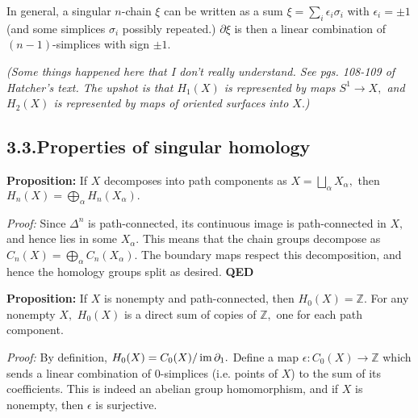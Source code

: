 \documentclass{article}
\begin{document}
\noindent{}In general, a singular $n$-chain $\xi$ can be written as a sum $\xi = \sum_i \epsilon_i \sigma_i$ with $\epsilon_i = \pm 1$ (and some simplices $\sigma_i$ possibly repeated.) $\partial\xi$ is then a linear combination of $(n-1)$-simplices with sign $\pm 1.$%

\emph{(Some things happened here that I don't really understand. See pgs. 108-109 of Hatcher's text. The upshot is that $H_1(X)$ is represented by maps $S^1 \to X,$ and $H_2(X)$ is represented by maps of oriented surfaces into $X.$)}%

\subsection{3.3.\hspace*{0.5em}Properties of singular homology}\label{sec-properties-of-singular-homology}%

\noindent{}\textbf{Proposition:} If $X$ decomposes into path components as $X = \bigsqcup_\alpha X_\alpha,$ then $H_n(X) = \bigoplus_\alpha H_n(X_\alpha).$%

\emph{Proof:} Since $\Delta^n$ is path-connected, its continuous image is path-connected in $X,$ and hence lies in some $X_\alpha.$ This means that the chain groups decompose as $C_n(X) = \bigoplus_\alpha C_n(X_\alpha).$ The boundary maps respect this decomposition, and hence the homology groups split as desired. \textbf{QED}%

\textbf{Proposition:} If $X$ is nonempty and path-connected, then $H_0(X) = \mathbb{Z}.$ For any nonempty $X,$ $H_0(X)$ is a direct sum of copies of $\mathbb{Z},$ one for each path component.%

\emph{Proof:} By definition, $H_0(X) = C_0(X) / \operatorname{im} \partial_1.$ Define a map $\epsilon: C_0(X) \to \mathbb{Z}$ which sends a linear combination of $0$-simplices (i.e. points of $X$) to the sum of its coefficients. This is indeed an abelian group homomorphism, and if $X$ is nonempty, then $\epsilon$ is surjective.%
\end{document}
